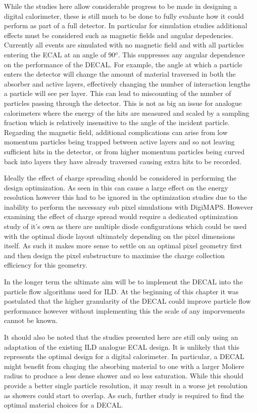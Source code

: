 While the studies here allow considerable progress to be made in designing a digital calorimeter, these is still much to be done to fully evaluate how it could perform as part of a full detector. In particular for simulation studies additional effects must be considered such as magnetic fields and angular depedencies. Currently all events are simulated with no magnetic field and with all particles entering the \ac{ECAL} at an angle of 90$^o$. This suppresses any angular dependence on the performance of the \ac{DECAL}. For example, the angle at which a particle enters the detector will change the amount of material traversed in both the absorber and active layers, effectively changing the number of interaction lengths a particle will see per layer. This can lead to miscounting of the number of particles passing through the detector. This is not as big an issue for analogue calorimeters where the energy of the hits are measured and scaled by a sampling fraction which is relatively insensitive to the angle of the incident particle. Regarding the magnetic field, additional complications can arise from low momentum particles being trapped between active layers and so not leaving sufficient hits in the detector, or from higher momentum particles being curved back into layers they have already traversed causing extra hits to be recorded.

Ideally the effect of charge spreading should be considered in performing the design optimization. As seen in  this can cause a large effect on the energy resolution however this had to be ignored in the optimization studies due to the inability to perform the necessary sub pixel simulations with DigiMAPS. However examining the effect of charge spread would require a dedicated optimization study of it's own as there are multiple diode configurations which could be used with the optimal diode layout ultimately depending on the pixel dimensions itself. As such it makes more sense to settle on an optimal pixel geometry first and then design the pixel substructure to maximise the charge collection efficiency for this geometry.

In the longer term the ultimate aim will be to implement the \ac{DECAL} into the particle flow algorithms used for \ac{ILD}. At the beginning of this chapter it was postulated that the higher granularity of the \ac{DECAL} could improve particle flow performance however without implementing this the scale of any imporvements cannot be known.

It should also be noted that the studies presented here are still only using an adaptation of the existing \ac{ILD} analogue \ac{ECAL} design. It is unlikely that this represents the optimal design for a digital calorimeter. In particular, a \ac{DECAL} might benefit from chaging the absorbing material to one with a larger Moliere radius to produce a less dense shower and so less saturation. While this should provide a better single particle resolution, it may result in a worse jet resolution as showers could start to overlap. As such, further study is required to find the optimal material choices for a \ac{DECAL}.



